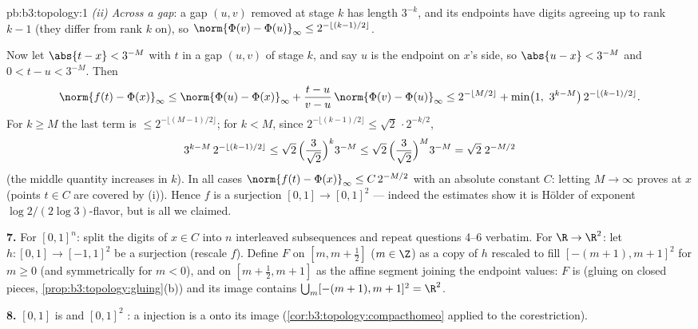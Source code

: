 \begin{solution}{pb:b3:topology:1}
\emph{(ii) Across a gap}: a gap $(u,v)$ removed at stage $k$
has length $3^{-k}$, and its endpoints have digits agreeing up
to rank $k - 1$ (they differ from rank $k$ on), so
$\norm{\Phi(v) - \Phi(u)}_\infty \leq
2^{-\lfloor (k-1)/2\rfloor}$.

Now let $\abs{t - x} < 3^{-M}$ with $t$ in a gap $(u, v)$ of
stage $k$, and say $u$ is the endpoint on $x$'s side, so
$\abs{u - x} < 3^{-M}$ and $0 < t - u < 3^{-M}$. Then
\[
\norm{f(t) - \Phi(x)}_\infty
\leq \norm{\Phi(u) - \Phi(x)}_\infty
+ \frac{t - u}{v - u}\,\norm{\Phi(v) - \Phi(u)}_\infty
\leq 2^{-\lfloor M/2\rfloor} + \min\bigl(1,\ 3^{k - M}\bigr)\,
2^{-\lfloor(k-1)/2\rfloor} .
\]
For $k \geq M$ the last term is $\leq 2^{-\lfloor(M-1)/2
\rfloor}$; for $k < M$, since $2^{-\lfloor(k-1)/2\rfloor} \leq
\sqrt2\,\cdot 2^{-k/2}$,
\[
3^{k-M}\,2^{-\lfloor(k-1)/2\rfloor}
\leq \sqrt2\,\Bigl(\frac{3}{\sqrt2}\Bigr)^{k} 3^{-M}
\leq \sqrt2\,\Bigl(\frac{3}{\sqrt2}\Bigr)^{M} 3^{-M}
= \sqrt2\; 2^{-M/2}
\]
(the middle quantity increases in $k$). In all cases
$\norm{f(t) - \Phi(x)}_\infty \leq C\,2^{-M/2}$
with an absolute constant $C$: letting $M \to \infty$ proves
 at $x$ (points $t \in C$ are covered by (i)). Hence
$f$ is a  surjection $[0,1] \to [0,1]^2$ --- indeed
the estimates show it is H\"older of exponent $\log 2/(2\log
3)$-flavor, but  is all we claimed.

\textbf{7.} For $[0,1]^n$: split the digits of $x \in C$ into
$n$ interleaved subsequences and repeat questions 4--6
verbatim. For $\R \to \R^2$: let $h \colon [0,1] \to [-1,1]^2$
be a  surjection (rescale $f$). Define $F$ on $[m, m
+ \frac12]$ ($m \in \Z$) as a copy of $h$ rescaled to fill
$[-(m+1), m+1]^2$ for $m \geq 0$ (and symmetrically for $m <
0$), and on $[m + \frac12, m + 1]$ as the affine segment
joining the endpoint values: $F$ is  (gluing on
closed pieces, \cref{prop:b3:topology:gluing}(b)) and its image
contains $\bigcup_m [-(m+1), m+1]^2 = \R^2$.

\textbf{8.} $[0,1]$ is  and $[0,1]^2$ : a
 injection is a  onto its image
(\cref{cor:b3:topology:compacthomeo} applied to the corestriction).


\end{solution}
